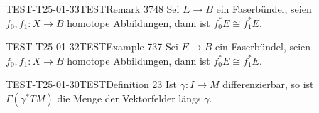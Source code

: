 \begin{REM}{TEST-T25-01-33}{TESTRemark 3748}
Sei $E \rightarrow B$ ein Faserbündel, seien $f_{0}, f_{1}: X \rightarrow B$ homotope Abbildungen, dann ist $f_{0}^{*} E \cong f_{1}^{*} E$.
\end{REM}

\begin{EXA}{TEST-T25-01-32}{TESTExample 737}
Sei $E \rightarrow B$ ein Faserbündel, seien $f_{0}, f_{1}: X \rightarrow B$ homotope Abbildungen, dann ist $f_{0}^{*} E \cong f_{1}^{*} E$.
\end{EXA}

\begin{EXA}{TEST-T25-01-30}{TESTDefinition 23}
Ist $\gamma: I \rightarrow M$ differenzierbar, so ist $\Gamma\left(\gamma^{*} T M\right)$ die Menge der Vektorfelder längs $\gamma$.
\end{EXA}